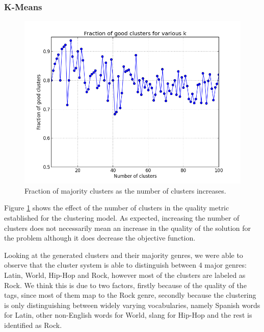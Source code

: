 \documentclass[10pt,a4paper]{scrartcl}
\begin{document}
      \subsubsection{K-Means}
        \begin{figure}[htbp]
 	        \centering
	        \includegraphics[scale=0.45]{img/k_means_good.png}
 	        \caption{Fraction of majority clusters as the number of clusters
 	                 increases.}
	        \label{figure:k_means}
	     \end{figure}
	      
	      Figure \ref{figure:k_means} shows the effect of the number of clusters
	      in the quality metric established for the clustering model. As expected,
	      increasing the number of clusters does not necessarily mean an increase
	      in the quality of the solution for the problem although it does
	      decrease the objective function.
	      
	      Looking at the generated clusters and their majority genres, we were
	      able to observe that the cluster system is able to distinguish between
	      4 major genres: Latin, World, Hip-Hop and Rock, however most of the
	      clusters are labeled as Rock. We think this is due to two factors,
	      firstly because of the quality of the tags,
	      since most of them map to the Rock genre,
	      secondly because the clustering is only distinguishing
	      between widely varying vocabularies, namely Spanish words for Latin,
	      other non-English words for World, slang for Hip-Hop and the rest is
	      identified as Rock.
	      
\end{document}
